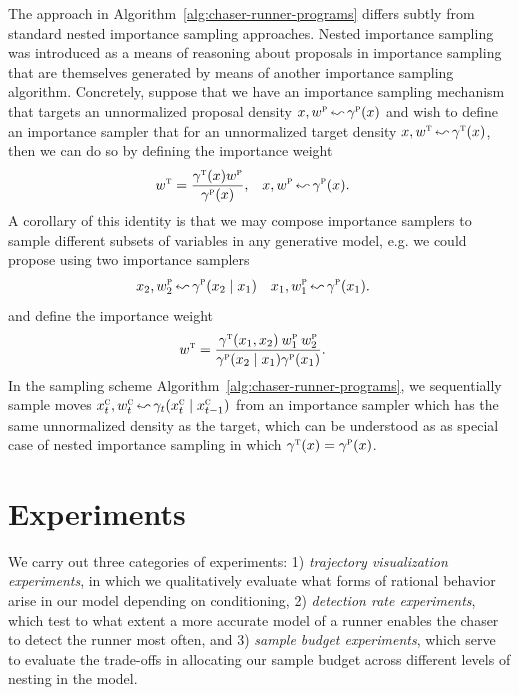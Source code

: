 \documentclass{article}
\newcommand{\eval}{\,\reflectbox{$\leadsto$}\:}
\begin{document}
The approach in Algorithm~\ref{alg:chaser-runner-programs} differs subtly from standard nested importance sampling approaches. Nested importance sampling was introduced as a means of reasoning about proposals in importance sampling that are themselves generated by means of another importance sampling algorithm. Concretely, suppose that we have an importance sampling mechanism that targets an unnormalized proposal density $x, w^\textsc{p} \eval \gamma^\textsc{p}(x)$ and wish to define an importance sampler that for an unnormalized target density $x, w^\textsc{t} \eval \gamma^\textsc{t}(x)$, then we can do so by defining the importance weight
\begin{align*}
    w^\textsc{t} 
    &= 
    \frac{\gamma^\textsc{t}(x) w^\textsc{p}}
         {\gamma^\textsc{p}(x)},
    &     
    x, w^\textsc{p} 
    &\eval \gamma^\textsc{p}(x).
\end{align*}
A corollary of this identity is that we may compose importance samplers to sample different subsets of variables in any generative model, e.g. we could propose using two importance samplers 
\begin{align*}
    x_2, w_2^\textsc{p} 
    &\eval 
    \gamma^\textsc{p}(x_2 \mid x_1)
    &
    x_1, w_1^\textsc{p}
    &\eval
    \gamma^\textsc{p}(x_1).
\end{align*}
and define the importance weight
\begin{align*}
    w^\textsc{t} 
    &= 
    \frac{\gamma^\textsc{t}(x_1, x_2) \: w_1^\textsc{p} \: w_2^\textsc{p}}
         {\gamma^\textsc{p}(x_2 \mid x_1) \gamma^\textsc{p}(x_1)}.
\end{align*}
In the sampling scheme Algorithm~\ref{alg:chaser-runner-programs}, we sequentially sample moves $x^\textsc{c}_t, w^\textsc{c}_t \eval \gamma_t(x^\textsc{c}_t \mid x^\textsc{c}_{t-1})$ from an importance sampler which has the same unnormalized density as the target, which can be understood as as special case of nested importance sampling in which $\gamma^\textsc{t}(x) = \gamma^\textsc{p}(x)$.
\vspace{-0.25em}
\section{Experiments}
\vspace{-0.25em}

We carry out three categories of experiments: 1) \textit{trajectory visualization experiments}, in which we qualitatively evaluate what forms of rational behavior arise in our model depending on conditioning, 2) \textit{detection rate experiments}, which test to what extent a more accurate model of a runner enables the chaser to detect the runner most often, and 3) \textit{sample budget experiments}, which serve to evaluate the trade-offs in allocating our sample budget across different levels of nesting in the model. 
\end{document}
